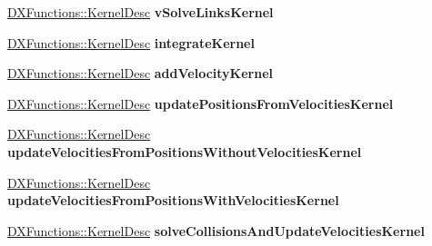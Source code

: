 \begin{DoxyCompactItemize}
\item 
\hypertarget{classbt_d_x11_soft_body_solver_adae523b922f2e66fb6e1d3cdf4fb56c6}{\hyperlink{class_d_x_functions_1_1_kernel_desc}{D\+X\+Functions\+::\+Kernel\+Desc} {\bfseries v\+Solve\+Links\+Kernel}}\label{classbt_d_x11_soft_body_solver_adae523b922f2e66fb6e1d3cdf4fb56c6}

\item 
\hypertarget{classbt_d_x11_soft_body_solver_a72a7b0635c3dc6ccce78a54657fcaa5c}{\hyperlink{class_d_x_functions_1_1_kernel_desc}{D\+X\+Functions\+::\+Kernel\+Desc} {\bfseries integrate\+Kernel}}\label{classbt_d_x11_soft_body_solver_a72a7b0635c3dc6ccce78a54657fcaa5c}

\item 
\hypertarget{classbt_d_x11_soft_body_solver_a588d2a90ff5f050458c0a3d27d69dd69}{\hyperlink{class_d_x_functions_1_1_kernel_desc}{D\+X\+Functions\+::\+Kernel\+Desc} {\bfseries add\+Velocity\+Kernel}}\label{classbt_d_x11_soft_body_solver_a588d2a90ff5f050458c0a3d27d69dd69}

\item 
\hypertarget{classbt_d_x11_soft_body_solver_ab65ac00fb0dec0769383feaa866b6366}{\hyperlink{class_d_x_functions_1_1_kernel_desc}{D\+X\+Functions\+::\+Kernel\+Desc} {\bfseries update\+Positions\+From\+Velocities\+Kernel}}\label{classbt_d_x11_soft_body_solver_ab65ac00fb0dec0769383feaa866b6366}

\item 
\hypertarget{classbt_d_x11_soft_body_solver_a5f9ea6b8975d1e24cb5952de4c85f47a}{\hyperlink{class_d_x_functions_1_1_kernel_desc}{D\+X\+Functions\+::\+Kernel\+Desc} {\bfseries update\+Velocities\+From\+Positions\+Without\+Velocities\+Kernel}}\label{classbt_d_x11_soft_body_solver_a5f9ea6b8975d1e24cb5952de4c85f47a}

\item 
\hypertarget{classbt_d_x11_soft_body_solver_a5aaa80bfd210a5eb52a2a73b4751527b}{\hyperlink{class_d_x_functions_1_1_kernel_desc}{D\+X\+Functions\+::\+Kernel\+Desc} {\bfseries update\+Velocities\+From\+Positions\+With\+Velocities\+Kernel}}\label{classbt_d_x11_soft_body_solver_a5aaa80bfd210a5eb52a2a73b4751527b}

\item 
\hypertarget{classbt_d_x11_soft_body_solver_a5a76ac12195e0b092dd775d213b23562}{\hyperlink{class_d_x_functions_1_1_kernel_desc}{D\+X\+Functions\+::\+Kernel\+Desc} {\bfseries solve\+Collisions\+And\+Update\+Velocities\+Kernel}}\label{classbt_d_x11_soft_body_solver_a5a76ac12195e0b092dd775d213b23562}


\end{DoxyCompactItemize}
